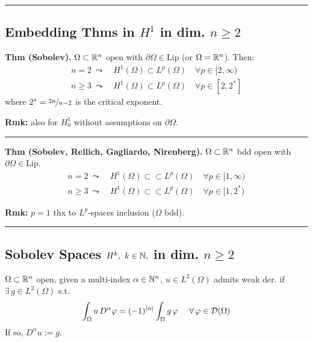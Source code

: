 \rule{0.31\textwidth}{0.2pt}


\subsection{\color{red}Embedding Thms in \texorpdfstring{$H^1$}{C} in dim. \texorpdfstring{$n\geq 2$}{C}}


\textbf{Thm (Sobolev).} $\Omega\subset \mathbb{R}^n$ open with $\partial\Omega\in\text{Lip}$ (or $\Omega=\mathbb{R}^n$). Then:
\begin{align*}
n=2\ \leadsto\ &H^1(\Omega)\subset L^p(\Omega)\quad \forall p\in [2,\infty) \\
n\geq 3\ \leadsto\ &H^1(\Omega)\subset L^p(\Omega)\quad \forall p\in [2,2^*]
\end{align*}
where $2^*=\nicefrac{2n}{n-2}$ is the critical exponent.

\smallskip

\textbf{Rmk:} also for $H^1_0$ without assumptions on $\partial\Omega$.

\rule{0.31\textwidth}{0.2pt}
\smallskip

\textbf{Thm (Sobolev, Rellich, Gagliardo, Nirenberg).} $\Omega\subset \mathbb{R}^n$ bdd open with $\partial\Omega\in\text{Lip}$.
\begin{align*}
n=2\ \leadsto\ &H^1(\Omega)\subset\subset L^p(\Omega)\quad \forall p\in [1,\infty) \\
n\geq 3\ \leadsto\ &H^1(\Omega)\subset\subset L^p(\Omega)\quad \forall p\in [1,2^*)
\end{align*}

\smallskip

\textbf{Rmk:} $p=1$ thx to $L^p$-spaces inclusion ($\Omega$ bdd).

\rule{0.31\textwidth}{0.2pt}


\subsection{\color{red}Sobolev Spaces \texorpdfstring{$H^k,\ k\in\mathbb{N},$}{C} in dim. \texorpdfstring{$n\geq 2$}{C}}


$\Omega\subset \mathbb{R}^n$ open, given a multi-index $\alpha\in \mathbb{N}^n$, $u\in L^2(\Omega)$ admits weak der. if $\exists\,g\in L^2(\Omega)$ s.t.
\begin{equation*}
\int_\Omega u\,D^\alpha\varphi=(-1)^{|\alpha|}\int_\Omega g\,\varphi\quad\ \forall\, \varphi\in \mathcal{D}(\Omega)
\end{equation*}
If so, $D^\alpha u :=g$.

